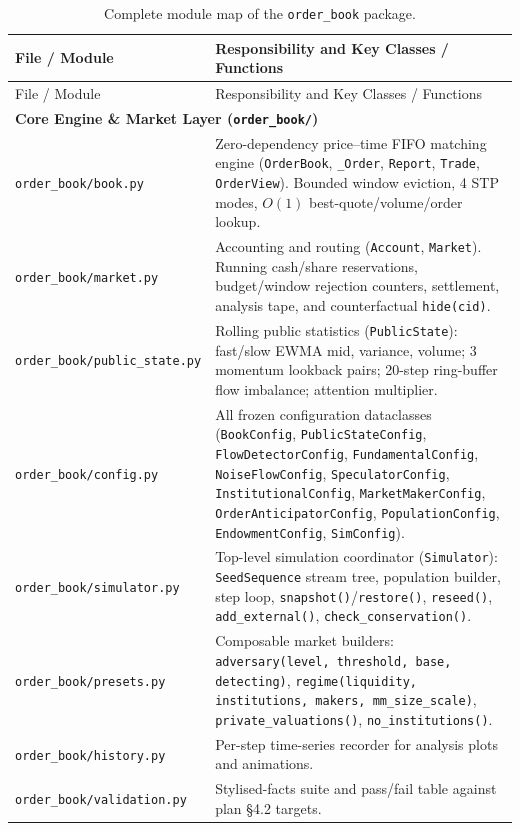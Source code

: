 \documentclass[11pt,a4paper]{article}
\newcommand{\code}[1]{\texttt{#1}}
\begin{document}
{\footnotesize\setlength{\tabcolsep}{4pt}
\begin{longtable}{L{4.0cm} L{10.5cm}}
\caption{Complete module map of the \code{order\_book} package.}\label{tab:module_map}\\
\toprule
File / Module & Responsibility and Key Classes / Functions \\
\midrule
\endfirsthead
\toprule
File / Module & Responsibility and Key Classes / Functions \\
\midrule
\endhead
\multicolumn{2}{l}{\textbf{Core Engine \& Market Layer (\code{order\_book/})}} \\
\code{order\_book/book.py} & Zero-dependency price--time FIFO matching engine (\code{OrderBook}, \code{\_Order}, \code{Report}, \code{Trade}, \code{OrderView}). Bounded window eviction, 4 STP modes, $O(1)$ best-quote/volume/order lookup. \\
\code{order\_book/market.py} & Accounting and routing (\code{Account}, \code{Market}). Running cash/share reservations, budget/window rejection counters, settlement, analysis tape, and counterfactual \code{hide(cid)}. \\
\code{order\_book/public\_state.py} & Rolling public statistics (\code{PublicState}): fast/slow EWMA mid, variance, volume; 3 momentum lookback pairs; 20-step ring-buffer flow imbalance; attention multiplier. \\
\code{order\_book/config.py} & All frozen configuration dataclasses (\code{BookConfig}, \code{PublicStateConfig}, \code{FlowDetectorConfig}, \code{FundamentalConfig}, \code{NoiseFlowConfig}, \code{SpeculatorConfig}, \code{InstitutionalConfig}, \code{MarketMakerConfig}, \code{OrderAnticipatorConfig}, \code{PopulationConfig}, \code{EndowmentConfig}, \code{SimConfig}). \\
\code{order\_book/simulator.py} & Top-level simulation coordinator (\code{Simulator}): \code{SeedSequence} stream tree, population builder, step loop, \code{snapshot()}/\code{restore()}, \code{reseed()}, \code{add\_external()}, \code{check\_conservation()}. \\
\code{order\_book/presets.py} & Composable market builders: \code{adversary(level, threshold, base, detecting)}, \code{regime(liquidity, institutions, makers, mm\_size\_scale)}, \code{private\_valuations()}, \code{no\_institutions()}. \\
\code{order\_book/history.py} & Per-step time-series recorder for analysis plots and animations. \\
\code{order\_book/validation.py} & Stylised-facts suite and pass/fail table against plan \S4.2 targets. \\

\end{longtable}}
\end{document}
